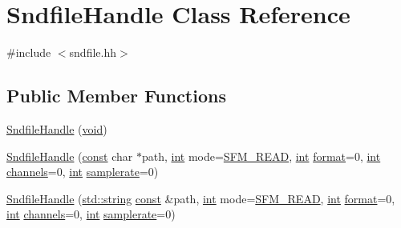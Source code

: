 \hypertarget{class_sndfile_handle}{}\section{Sndfile\+Handle Class Reference}
\label{class_sndfile_handle}


{\ttfamily \#include $<$sndfile.\+hh$>$}

\subsection*{Public Member Functions}
\begin{DoxyCompactItemize}
\item 
\hyperlink{class_sndfile_handle_a90b0e918f3531329dfb4ab0988187add}{Sndfile\+Handle} (\hyperlink{sound_8c_ae35f5844602719cf66324f4de2a658b3}{void})
\item 
\hyperlink{class_sndfile_handle_a60e5ec8dac736c5f3a2fdc95e7e9c70e}{Sndfile\+Handle} (\hyperlink{getopt1_8c_a2c212835823e3c54a8ab6d95c652660e}{const} char $\ast$path, \hyperlink{xmltok_8h_a5a0d4a5641ce434f1d23533f2b2e6653}{int} mode=\hyperlink{win_2_projects_2libsndfile_2sndfile_8h_a893dbd60c5ebe415600523fbae202880a125531fe9c895237bccd35736370e815}{S\+F\+M\+\_\+\+R\+E\+AD}, \hyperlink{xmltok_8h_a5a0d4a5641ce434f1d23533f2b2e6653}{int} \hyperlink{class_sndfile_handle_afb31af9b5abeb6e0fec464a3fe60c906}{format}=0, \hyperlink{xmltok_8h_a5a0d4a5641ce434f1d23533f2b2e6653}{int} \hyperlink{class_sndfile_handle_a81d6738501e66fc7a12469c4ec1608bf}{channels}=0, \hyperlink{xmltok_8h_a5a0d4a5641ce434f1d23533f2b2e6653}{int} \hyperlink{class_sndfile_handle_a35bc814b03ba0cb72a78ce83204a1f87}{samplerate}=0)
\item 
\hyperlink{class_sndfile_handle_af782c1d529a09587c127272bd96cb42a}{Sndfile\+Handle} (\hyperlink{test__lib_f_l_a_c_2format_8c_ab02026ad0de9fb6c1b4233deb0a00c75}{std\+::string} \hyperlink{getopt1_8c_a2c212835823e3c54a8ab6d95c652660e}{const} \&path, \hyperlink{xmltok_8h_a5a0d4a5641ce434f1d23533f2b2e6653}{int} mode=\hyperlink{win_2_projects_2libsndfile_2sndfile_8h_a893dbd60c5ebe415600523fbae202880a125531fe9c895237bccd35736370e815}{S\+F\+M\+\_\+\+R\+E\+AD}, \hyperlink{xmltok_8h_a5a0d4a5641ce434f1d23533f2b2e6653}{int} \hyperlink{class_sndfile_handle_afb31af9b5abeb6e0fec464a3fe60c906}{format}=0, \hyperlink{xmltok_8h_a5a0d4a5641ce434f1d23533f2b2e6653}{int} \hyperlink{class_sndfile_handle_a81d6738501e66fc7a12469c4ec1608bf}{channels}=0, \hyperlink{xmltok_8h_a5a0d4a5641ce434f1d23533f2b2e6653}{int} \hyperlink{class_sndfile_handle_a35bc814b03ba0cb72a78ce83204a1f87}{samplerate}=0)

\end{DoxyCompactItemize}
